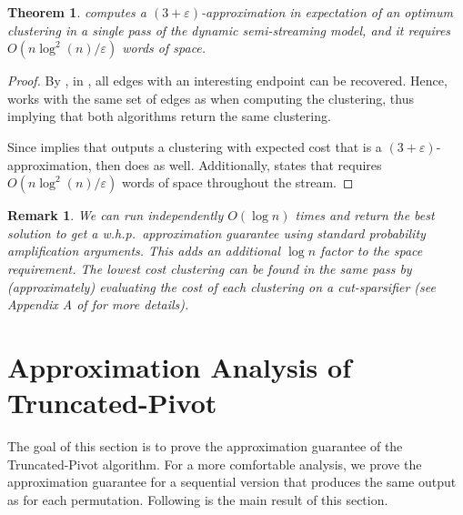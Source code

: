 \documentclass[10pt,a4paper]{article}
\makeatletter
\newtheorem{theorem}{Theorem}[section]
\newtheorem{remark}{Remark}[section]
\newcommand{\seqtruncatedpivot}{Sequential \textrm{Truncated-Pivot}\xspace}
\newcommand{\truncatedpivot}{\textrm{Truncated-Pivot}\xspace}
\newcommand{\eps}{\ensuremath{\varepsilon}}
\newcommand\IfRestateTF{%
  \ifx\label\thmt@gobble@label %
    \expandafter\@firstoftwo
  \else
    \expandafter\@secondoftwo
  \fi
}
\newcommand{\RestateRemark}{\IfRestateTF{{\normalfont\bfseries (Restated) }}{}}
\makeatother
\begin{document}
{\begin{theorem}
     computes a $(3+\eps)$-approximation in expectation of an optimum clustering in a single pass of the dynamic semi-streaming model, and it requires $O(n\log^2(n)/\eps)$ words of space.
\end{theorem} 

\begin{proof}
    By , in , all edges with an interesting endpoint can be recovered. Hence,  works with the same set of edges as  when computing the clustering, thus implying that both algorithms return the same clustering. 
    
    Since  implies that  outputs a clustering with expected cost that is a $(3+\eps)$-approximation, then  does as well. 
    Additionally,  states that  requires $O(n\log^2(n)/\eps)$ words of space throughout the stream. 
\end{proof}

\begin{remark}
    We can run  independently $O(\log n)$ times and return the best solution to get a w.h.p.\ approximation guarantee using standard probability amplification arguments. This adds an additional $\log n$ factor to the space requirement. The lowest cost clustering can be found in the same pass by (approximately) evaluating the cost of each clustering on a cut-sparsifier \cite{ahn2009CutSparsifiers} (see Appendix A of \cite{behnezhad2023single} for more details).
\end{remark}

}

\section{Approximation Analysis of \truncatedpivot}\label{sec: approximation-analysis}

The goal of this section is to prove the approximation guarantee of the \truncatedpivot algorithm.
For a more comfortable analysis, we prove the approximation guarantee for a sequential version that produces the same output as  for each permutation. Following is the main result of this section.

\end{document}
